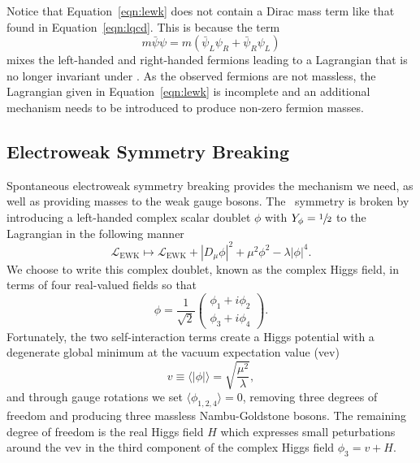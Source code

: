 Notice that Equation~\ref{eqn:lewk} does not contain a Dirac mass term like that found in Equation~\ref{eqn:lqcd}.
This is because the term
\begin{equation}
  m \bar \psi \psi = m \left( \bar \psi_L \psi_R + \bar \psi_R \psi_L \right)
\end{equation}
mixes the left-handed and right-handed fermions leading to a Lagrangian that is no longer invariant under \sutwo.
As the observed fermions are not massless, the Lagrangian given in Equation~\ref{eqn:lewk} is incomplete and an additional mechanism needs to be introduced to produce non-zero fermion masses.

\subsection{Electroweak Symmetry Breaking}
\label{subsec:ewsb}

Spontaneous electroweak symmetry breaking provides the mechanism we need, as well as providing masses to the weak gauge bosons. The \sutwo\ symmetry is broken by introducing a left-handed complex scalar doublet $\phi$ with $Y_\phi = \sfrac{1}{2}$ to the Lagrangian in the following manner
\begin{equation}
  \label{eqn:ewsb}
  \mathcal{L}_{\text{EWK}} \mapsto \mathcal{L}_{\text{EWK}} + \left|D_\mu \phi \right|^2 + \mu^2 \phi^2 - \lambda \left| \phi \right|^4 .
\end{equation}
We choose to write this complex doublet, known as the complex Higgs field, in terms of four real-valued fields so that
\begin{equation}
  \phi = \frac{1}{\sqrt{2}} \begin{pmatrix} \phi_1 + i \phi_2 \\ \phi_3 + i\phi_4 \end{pmatrix} .
\end{equation}
Fortunately, the two self-interaction terms create a Higgs potential with a degenerate global minimum at the vacuum expectation value (vev)
\begin{equation}
  v \equiv \langle | \phi | \rangle = \sqrt{ \frac{\mu^2}{\lambda}},
\end{equation}
and through gauge rotations we set $\langle \phi_{1,2,4} \rangle = 0$, removing three degrees of freedom and producing three massless Nambu-Goldstone bosons.
The remaining degree of freedom is the real Higgs field $H$ which expresses small peturbations around the vev in the third component of the complex Higgs field $\phi_3 = v + H$.

